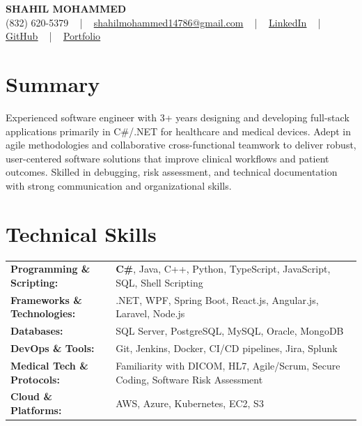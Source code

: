 \documentclass[letterpaper,11pt]{article}
\begin{document}
\begin{center}
    {\fontsize{14pt}{12pt}\selectfont \textbf{\MakeUppercase{Shahil Mohammed}}}\\ \vspace{2pt}
    \fontsize{10pt}{12pt}\selectfont (832) 620-5379 ~ | ~ \href{mailto:shahilmohammed14786@gmail.com}{shahilmohammed14786@gmail.com} ~ | ~  
    \href{https://www.linkedin.com/in/shahil-mohammed-9652931a1/}{\color{blue}\underline{LinkedIn}}  ~ | ~ 
    \href{https://github.com/freakbeast14}{\color{blue}\underline{GitHub}} ~ | ~ 
    \href{https://shahil-mohammed.netlify.app/}{\color{blue}\underline{Portfolio}}
    \vspace{-8pt}
\end{center}

\section{Summary}
\fontsize{9pt}{10pt}\selectfont
Experienced software engineer with 3+ years designing and developing full-stack applications primarily in C#/.NET for healthcare and medical devices. Adept in agile methodologies and collaborative cross-functional teamwork to deliver robust, user-centered software solutions that improve clinical workflows and patient outcomes. Skilled in debugging, risk assessment, and technical documentation with strong communication and organizational skills.
 \vspace{-5pt}
 
\section{Technical Skills}
        \vspace{-14pt}
        \begin{table}[h]
            \fontsize{9pt}{10pt}\selectfont
            \begin{tabular}{p{0.3\linewidth} p{0.7\linewidth}}
                \textbf{Programming \& Scripting:} & \textbf{C\#}, Java, C++, Python, TypeScript, JavaScript, SQL, Shell Scripting \\
                \textbf{Frameworks \& Technologies:} & .NET, WPF, Spring Boot, React.js, Angular.js, Laravel, Node.js \\
                \textbf{Databases:} & SQL Server, PostgreSQL, MySQL, Oracle, MongoDB \\
                \textbf{DevOps \& Tools:} & Git, Jenkins, Docker, CI/CD pipelines, Jira, Splunk \\
                \textbf{Medical Tech \& Protocols:} & Familiarity with DICOM, HL7, Agile/Scrum, Secure Coding, Software Risk Assessment \\
                \textbf{Cloud \& Platforms:} & AWS, Azure, Kubernetes, EC2, S3 \\
            \end{tabular}
        \end{table}
 \vspace{-15pt}
 
\end{document}
